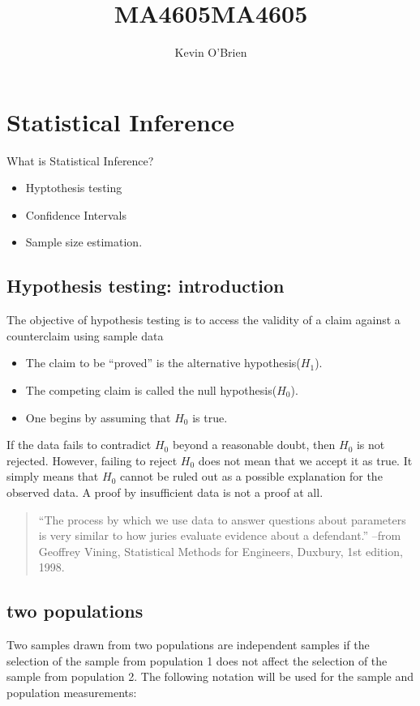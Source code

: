 \documentclass[14pt, a4paper]{article}
\title{MA4605}
\author{ } \date{ }
\theoremstyle{plain}
\theoremstyle{definition}
\theoremstyle{remark}
\begin{document}
\author{Kevin O'Brien}
\title{MA4605}

\tableofcontents \setcounter{tocdepth}{2}


\section{Statistical Inference} What is Statistical Inference?
\begin{itemize}\item Hyptothesis testing \item Confidence
Intervals \item Sample size estimation.\end{itemize}

\subsection{Hypothesis testing: introduction}
The objective of hypothesis testing is to access the validity of a claim against a counterclaim using sample data
\begin{itemize}\item The claim to be “proved” is the alternative hypothesis($H_1$).\item The competing claim is called the null hypothesis($H_0$).\item One begins by assuming that $H_0$ is true. \end{itemize}

If the data fails to contradict $H_0$ beyond a reasonable doubt, then $H_0$ is not rejected. However, failing to reject $H_0$ does not mean that we accept it as true. It simply means that $H_0$ cannot be ruled out as a possible explanation for the observed data. A proof by insufficient data is not a proof at all.

\begin{quote}
“The process by which we use data to answer questions about parameters
is very similar to how juries evaluate evidence about a defendant.” –from
Geoffrey Vining, Statistical Methods for Engineers, Duxbury, 1st edition,
1998.
\end{quote}




\subsection{two populations}

Two samples drawn from two populations are independent samples if
the selection of the sample from population 1 does not affect the
selection of the sample from population 2. The following notation
will be used for the sample and population measurements:
\end{document}
